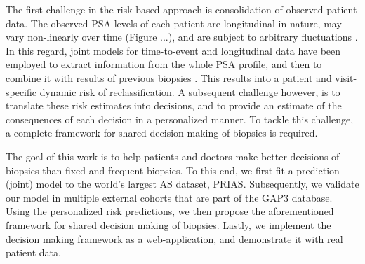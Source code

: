 The first challenge in the risk based approach is consolidation of observed patient data. The observed PSA levels of each patient are longitudinal in nature, may vary non-linearly over time (Figure ...), and are subject to arbitrary fluctuations \citep{ito2003natural}. In this regard, joint models for time-to-event and longitudinal data \citep{rizopoulos2012joint} have been employed to extract information from the whole PSA profile, and then to combine it with results of previous biopsies \citep{tomer2019,coley2017prediction}. This results into a patient and visit-specific dynamic risk of reclassification. A subsequent challenge however, is to translate these risk estimates into decisions, and to provide an estimate of the consequences of each decision in a personalized manner. To tackle this challenge, a complete framework for shared decision making of biopsies is required.

The goal of this work is to help patients and doctors make better decisions of biopsies than fixed and frequent biopsies. To this end, we first fit a prediction (joint) model to the world's largest AS dataset, PRIAS. Subsequently, we validate our model in multiple external cohorts that are part of the GAP3 database. Using the personalized risk predictions, we then propose the aforementioned framework for shared decision making of biopsies. Lastly, we implement the decision making framework as a web-application, and demonstrate it with real patient data.